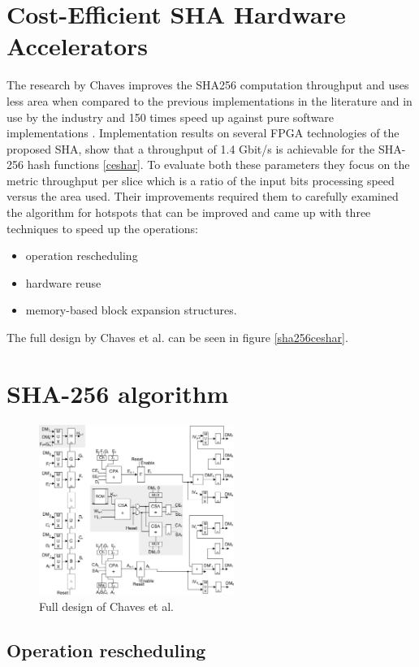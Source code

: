 \documentclass[conference]{IEEEtran}
\begin{document}
\section{Cost-Efficient SHA Hardware Accelerators} \label{cesha}
The research by Chaves \cite{ceshar} improves the SHA256 computation throughput and uses less area when compared to the previous implementations in the literature and in use by the industry and 150 times speed up against pure software implementations \cite{ceshar}.  Implementation results on several FPGA technologies of the proposed SHA, show that a throughput of 1.4 Gbit/s is achievable for the SHA-256 hash functions \ref{ceshar}. To evaluate both these parameters they focus on the metric throughput per slice which is a ratio of the input bits processing speed versus the area used. Their improvements required them to carefully examined the algorithm for hotspots that can be improved and came up with three techniques to speed up the operations:
\begin{itemize}
\item operation rescheduling
\item hardware reuse
\item memory-based block expansion structures.
\end{itemize}	
The full design by Chaves et al. can be seen in figure \ref{sha256ceshar}.

\section{SHA-256 algorithm} \label{sha256}
\begin{figure}[!t]
\centering
\includegraphics[width=2.5in]{sha256ceshar}
\caption{Full design of Chaves et al.}
\label{fig:sha256ceshar}
\end{figure}

\subsection{Operation rescheduling}
\end{document}
